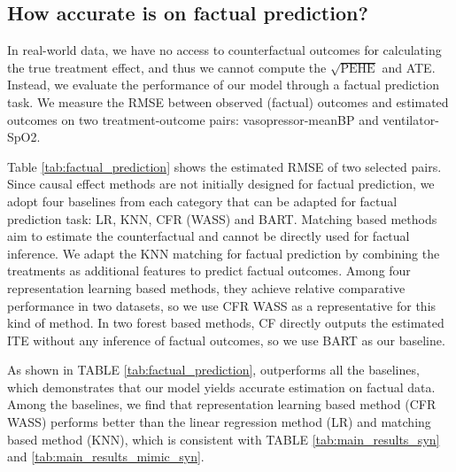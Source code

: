 \vspace{-3pt}
\subsection{How accurate is \model on factual prediction?}
In real-world data, we have no access to counterfactual outcomes for calculating the true treatment effect, and thus we cannot compute the $\sqrt{\text{PEHE}}$ and ATE. Instead, we evaluate the performance of our model through a factual prediction task. We measure the RMSE between observed (factual) outcomes and estimated outcomes on two treatment-outcome pairs: vasopressor-meanBP and ventilator-SpO2.


Table \ref{tab:factual_prediction} shows the estimated RMSE of two selected pairs. Since causal effect methods are not initially designed for factual prediction, we adopt four baselines from each category that can be adapted for factual prediction task: LR, KNN, CFR (WASS) and BART. Matching based methods aim to estimate the counterfactual and cannot be directly used for factual inference. We adapt the KNN matching for factual prediction by combining the treatments as additional features to predict factual outcomes. Among four representation learning based methods, they achieve relative comparative performance in two datasets, so we use CFR WASS as a representative for this kind of method. In two forest based methods, CF directly outputs the estimated ITE without any inference of factual outcomes, so we use BART as our baseline. 


As shown in TABLE \ref{tab:factual_prediction}, \model outperforms all the baselines, which demonstrates that our model yields accurate estimation on factual data. Among the baselines, we find that representation learning based method (CFR WASS) performs better than the linear regression method (LR) and matching based method (KNN), which is consistent with TABLE \ref{tab:main_results_syn} and \ref{tab:main_results_mimic_syn}. 

